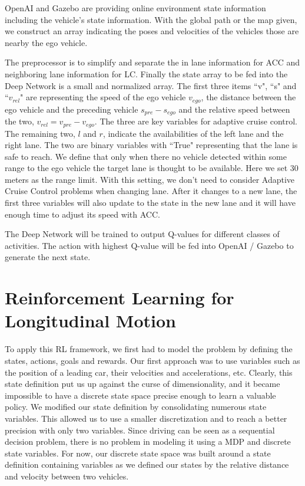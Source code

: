 OpenAI and Gazebo are providing online environment state information including the vehicle's state information. With the global path or the map given, we construct an array indicating the poses and velocities of the vehicles those are nearby the ego vehicle.

The preprocessor is to simplify and separate the in lane information for ACC and neighboring lane information for LC. Finally the state array to be fed into the Deep Network is a small and normalized array. The first three items ``v", ``s" and ``$v_{rel}$" are representing the speed of the ego vehicle $v_{ego}$, the distance between the ego vehicle and the preceding vehicle $s_{pre} - s_{ego}$ and the relative speed between the two, $v_{rel} = v_{pre} - v_{ego}$. The three are key variables for adaptive cruise control. The remaining two, $l$ and $r$, indicate the availabilities of the left lane and the right lane. The two are binary variables with ``True" representing that the lane is safe to reach. We define that only when there no vehicle detected within some range to the ego vehicle the target lane is thought to be available. Here we set 30 meters as the range limit. With this setting, we don't need to consider Adaptive Cruise Control problems when changing lane. After it changes to a new lane, the first three variables will also update to the state in the new lane and it will have enough time to adjust its speed with ACC.

The Deep Network will be trained to output Q-values for different classes of activities. The action with highest Q-value will be fed into OpenAI / Gazebo to generate the next state.

\section{Reinforcement Learning for Longitudinal Motion}

To apply this RL framework, we first had to model the problem by defining the states, actions, goals and rewards. Our first approach was to use variables such as the position of a leading car, their velocities and accelerations, etc. Clearly, this state definition put us up against the curse of dimensionality, and it became impossible to have a discrete state space precise enough to learn a valuable policy. We modified our state definition by consolidating numerous state variables. This allowed us to use a smaller discretization and to reach a better precision with only two variables. Since driving can be seen as a sequential decision problem, there is no problem in modeling it using a MDP and discrete state variables. For now, our discrete state space was built around a state definition containing variables as we defined our states by the relative distance and velocity between two vehicles.


